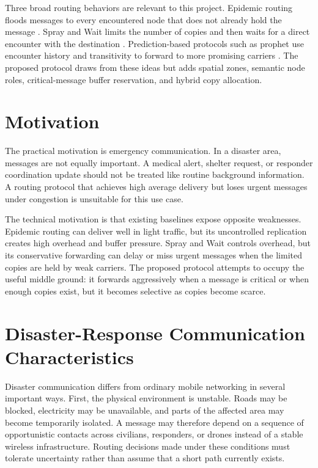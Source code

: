 Three broad routing behaviors are relevant to this project. Epidemic routing floods messages to every encountered node that does not already hold the message \citep{vahdat2000epidemic}. Spray and Wait limits the number of copies and then waits for a direct encounter with the destination \citep{spyropoulos2005spray}. Prediction-based protocols such as \ac{prophet} use encounter history and transitivity to forward to more promising carriers \citep{lindgren2012prophet}. The proposed protocol draws from these ideas but adds spatial zones, semantic node roles, critical-message buffer reservation, and hybrid copy allocation.

\section{Motivation}
The practical motivation is emergency communication. In a disaster area, messages are not equally important. A medical alert, shelter request, or responder coordination update should not be treated like routine background information. A routing protocol that achieves high average delivery but loses urgent messages under congestion is unsuitable for this use case.

The technical motivation is that existing baselines expose opposite weaknesses. Epidemic routing can deliver well in light traffic, but its uncontrolled replication creates high overhead and buffer pressure. Spray and Wait controls overhead, but its conservative forwarding can delay or miss urgent messages when the limited copies are held by weak carriers. The proposed protocol attempts to occupy the useful middle ground: it forwards aggressively when a message is critical or when enough copies exist, but it becomes selective as copies become scarce.

\section{Disaster-Response Communication Characteristics}
Disaster communication differs from ordinary mobile networking in several important ways. First, the physical environment is unstable. Roads may be blocked, electricity may be unavailable, and parts of the affected area may become temporarily isolated. A message may therefore depend on a sequence of opportunistic contacts across civilians, responders, or drones instead of a stable wireless infrastructure. Routing decisions made under these conditions must tolerate uncertainty rather than assume that a short path currently exists.

